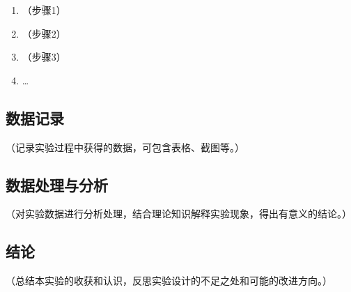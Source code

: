 \begin{enumerate}
    \item （步骤1）
    \item （步骤2）
    \item （步骤3）
    \item \ldots
\end{enumerate}

\subsection{数据记录}

（记录实验过程中获得的数据，可包含表格、截图等。）

\subsection{数据处理与分析}

（对实验数据进行分析处理，结合理论知识解释实验现象，得出有意义的结论。）

\subsection{结论}

（总结本实验的收获和认识，反思实验设计的不足之处和可能的改进方向。）
